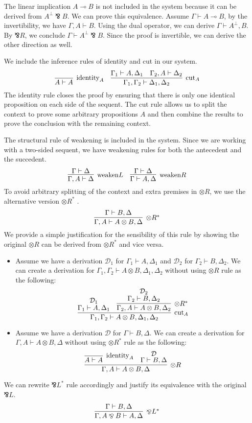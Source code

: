 \documentclass[12pt, openany]{memoir}
\newcommand*{\pare}[0]{\mathbin{\bindnasrepma}}
\begin{document}
The linear implication $A \multimap B$ is not included in the system because it can be derived from $A^\bot \pare B$. 
We can prove this equivalence. Assume $\Gamma \vdash A \multimap B$, by the invertibility, we have $\Gamma, A \vdash B$. 
Using the dual operator, we can derive $\Gamma \vdash A^\bot, B$. By $\pare R$, we conclude $\Gamma \vdash A^\bot \pare B$. 
Since the proof is invertible, we can derive the other direction as well.

We include the inference rules of identity and cut in our system.
\[
  \infer[\text{identity}_A]{A \vdash A}{}
  \quad
  \infer[\text{cut}_A]{\Gamma_1, \Gamma_2 \vdash \Delta_1, \Delta_2}{
    \Gamma_1 \vdash A, \Delta_1
    &
    \Gamma_2, A \vdash \Delta_2
  }
\]
The identity rule closes the proof by ensuring that there is only one identical proposition on each side of the sequent. 
The cut rule allows us to split the context to prove some arbitrary propositions $A$ 
and then combine the results to prove the conclusion with the remaining context.

The structural rule of weakening is included in the system. Since we are working with a two-sided sequent, 
we have weakening rules for both the antecedent and the succedent.
\[
  \infer[\text{weaken}L]{
    \Gamma, A \vdash \Delta
  }{
    \Gamma \vdash \Delta
  }
  \quad
  \infer[\text{weaken}R]{
    \Gamma \vdash A, \Delta
  }{
    \Gamma \vdash \Delta
  }
\]
To avoid arbitrary splitting of the context and extra premises in $\otimes R$, we use the alternative version $\otimes R^*$ \cite{Caires2010}.
\[
  \infer[\otimes R^*]{\Gamma, A \vdash A \otimes B, \Delta}{
    \Gamma \vdash B, \Delta
  }
\]
We provide a simple justification for the sensibility of this rule by showing the original $\otimes R$ can be derived from $\otimes R^*$ and vice versa.
\begin{itemize}
  \item Assume we have a derivation $\mathcal{D}_1$ for $\Gamma_1 \vdash A, \Delta_1$ and $\mathcal{D}_2$ for $\Gamma_2 \vdash B, \Delta_2$.
  We can create a derivation for $\Gamma_1, \Gamma_2 \vdash A \otimes B, \Delta_1, \Delta_2$ without using $\otimes R$ rule as the following:
  \[
    \infer[\text{cut}_A]{\Gamma_1, \Gamma_2 \vdash A \otimes B, \Delta_1, \Delta_2}{
      \deduce{\Gamma_1 \vdash A, \Delta_1}{\mathcal{D}_1}
      &
      \infer[\otimes R^*]{\Gamma_2, A \vdash A \otimes B, \Delta_2}{
        \deduce{\Gamma_2 \vdash B, \Delta_2}{\mathcal{D}_2}
      }
    }
  \]
  \item Assume we have a derivation $\mathcal{D}$ for $\Gamma \vdash B, \Delta$.
  We can create a derivation for $\Gamma, A \vdash A \otimes B, \Delta$ without using $\otimes R^*$ rule as the following:
  \[
    \infer[\otimes R]{\Gamma, A \vdash A \otimes B, \Delta}{
      \infer[\text{identity}_A]{A \vdash A}{}
      &
      \deduce{\Gamma \vdash B, \Delta}{\mathcal{D}}
    }
  \]
\end{itemize}
We can rewrite $\pare L^*$ rule accordingly and justify its equivalence with the original $\pare L$. 
\[
  \infer[\pare L^*]{\Gamma, A \pare B \vdash A, \Delta}{
    \Gamma \vdash B, \Delta
  }
\]
\end{document}
